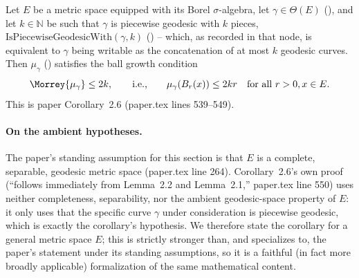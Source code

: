 \begin{corollary}
  \label{C1-small-ball}
  Let $E$ be a metric space equipped with its Borel $\sigma$-algebra, let $\gamma \in \Theta(E)$
  (), and let $k \in \mathbb{N}$ be such that $\gamma$ is piecewise geodesic with $k$
  pieces, $\mathrm{IsPiecewiseGeodesicWith}(\gamma,k)$ () -- which,
  as recorded in that node, is equivalent to $\gamma$ being writable as the concatenation of at
  most $k$ geodesic curves. Then $\mu_\gamma$ () satisfies the ball growth
  condition
  \[
    \Morrey{\mu_\gamma} \le 2k
    ,\qquad\text{i.e.,}\qquad
    \mu_\gamma(B_r(x)) \le 2kr\quad\text{for all } r>0, x\in E
    .
  \]
  This is paper Corollary~2.6 (paper.tex lines 539--549).

  \paragraph{On the ambient hypotheses.} The paper's standing assumption for this section is that
  $E$ is a complete, separable, geodesic metric space (paper.tex line 264). Corollary~2.6's own
  proof (``follows immediately from Lemma~2.2 and Lemma~2.1,'' paper.tex line 550) uses neither
  completeness, separability, nor the ambient geodesic-space property of $E$: it only uses that the
  specific curve $\gamma$ under consideration is piecewise geodesic, which is exactly the corollary's
  hypothesis. We therefore state the corollary for a general metric space $E$; this is strictly
  stronger than, and specializes to, the paper's statement under its standing assumptions, so it is
  a faithful (in fact more broadly applicable) formalization of the same mathematical content.
\end{corollary}
